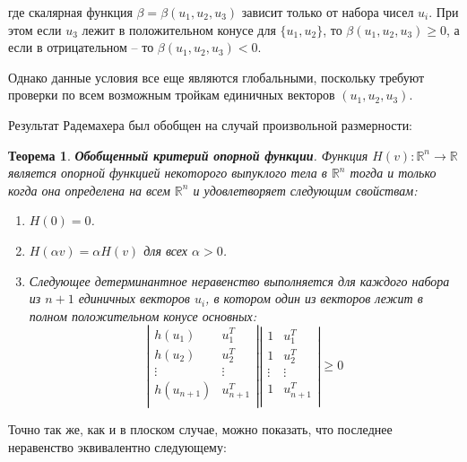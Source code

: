 \documentclass[a4paper, 12pt, titlepage]{article}
\theoremstyle{definition}
\theoremstyle{plain}
\newtheorem{SmartTheorem}{Теорема}
\theoremstyle{plain}
\begin{document}
где скалярная функция $\beta = \beta(u_{1}, u_{2}, u_{3})$ зависит только от
набора чисел $u_{i}$. При этом если $u_{3}$ лежит в положительном конусе для
$\{u_{1}, u_{2}\}$, то $\beta(u_{1}, u_{2}, u_{3}) \geq 0$, а если в
отрицательном -- то $\beta(u_{1}, u_{2}, u_{3}) < 0$.

Однако данные условия все еще являются глобальными, поскольку требуют проверки
по всем возможным тройкам единичных векторов $(u_{1}, u_{2}, u_{3})$.

Результат Радемахера был обобщен на случай произвольной размерности:

\begin{SmartTheorem}
 \label{thm:support-function-criterio-ext}
 \textbf{Обобщенный критерий опорной функции}.
 Функция $H(v): \mathbb{R}^{n} \to \mathbb{R}$ является опорной функцией
 некоторого выпуклого тела в $\mathbb{R}^{n}$ тогда и только когда она
 определена на всем $\mathbb{R}^{n}$ и удовлетворяет следующим свойствам:
 \begin{enumerate}
  \item $H(0) = 0$.
  \item $H(\alpha v) = \alpha H(v)$ для всех $\alpha > 0$.
  \item Следующее детерминантное неравенство выполняется для каждого набора из
  $n + 1$ единичных векторов $u_{i}$, в котором один из векторов лежит в полном
  положительном конусе основных:
\begin{equation}
\label{thm:support-function-criterio-ext:condition}
 \left|\begin{array}{cc}
  h(u_{1}) & u_{1}^{T} \\
  h(u_{2}) & u_{2}^{T} \\
  \vdots & \vdots \\
  h(u_{n + 1}) & u_{n + 1}^{T} \\
 \end{array}\right|
  \left|\begin{array}{cc}
  1 & u_{1}^{T} \\
  1 & u_{2}^{T} \\
  \vdots & \vdots \\
  1 & u_{n + 1}^{T} \\
 \end{array}\right|
 \geq 0
\end{equation}

 \end{enumerate}
\end{SmartTheorem}

Точно так же, как и в плоском случае, можно показать, что последнее неравенство
эквивалентно следующему:
\end{document}
